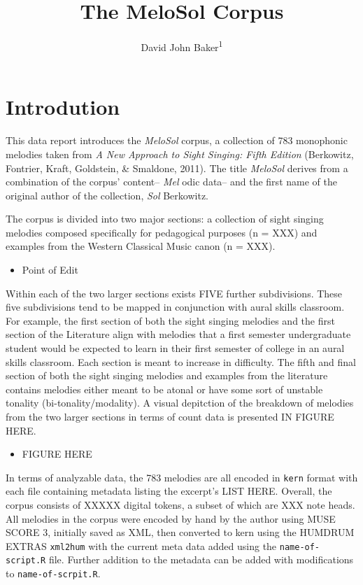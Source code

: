 \documentclass[english,man]{apa6}
\author{David John Baker\textsuperscript{1}}
\affiliation{
\vspace{0.5cm}
\textsuperscript{1} Louisiana State University}
\title{The MeloSol Corpus}
\date{}
\providecommand{\tightlist}{%
  \setlength{\itemsep}{0pt}\setlength{\parskip}{0pt}}
\begin{document}
\maketitle

\hypertarget{introdution}{%
\section{Introdution}\label{introdution}}

This data report introduces the \emph{MeloSol} corpus, a collection of 783 monophonic melodies taken from \emph{A New Approach to Sight Singing: Fifth Edition} (Berkowitz, Fontrier, Kraft, Goldstein, \& Smaldone, 2011).
The title \emph{MeloSol} derives from a combination of the corpus' content-- \emph{Mel} odic data-- and the first name of the original author of the collection, \emph{Sol} Berkowitz.

The corpus is divided into two major sections: a collection of sight singing melodies composed specifically for pedagogical purposes (n = XXX) and examples from the Western Classical Music canon (n = XXX).

\begin{itemize}
\tightlist
\item
  Point of Edit
\end{itemize}

Within each of the two larger sections exists FIVE further subdivisions.
These five subdivisions tend to be mapped in conjunction with aural skills classroom.
For example, the first section of both the sight singing melodies and the first section of the Literature align with melodies that a first semester undergraduate student would be expected to learn in their first semester of college in an aural skills classroom.
Each section is meant to increase in difficulty.
The fifth and final section of both the sight singing melodies and examples from the literature contains melodies either meant to be atonal or have some sort of unstable tonality (bi-tonality/modality).
A visual depitction of the breakdown of melodies from the two larger sections in terms of count data is presented IN FIGURE HERE.

\begin{itemize}
\tightlist
\item
  FIGURE HERE
\end{itemize}

In terms of analyzable data, the 783 melodies are all encoded in \texttt{kern} format with each file containing metadata listing the excerpt's LIST HERE.
Overall, the corpus consists of XXXXX digital tokens, a subset of which are XXX note heads.
All melodies in the corpus were encoded by hand by the author using MUSE SCORE 3, initially saved as XML, then converted to kern using the HUMDRUM EXTRAS \texttt{xml2hum} with the current meta data added using the \texttt{name-of-script.R} file.
Further addition to the metadata can be added with modifications to \texttt{name-of-scrpit.R}.
\end{document}
